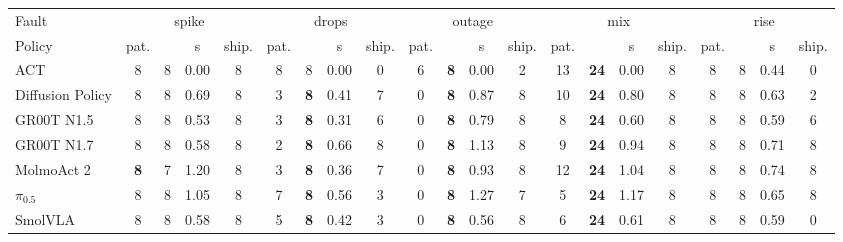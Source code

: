 \begin{tabular}{l cccccccccccccccccccc}
\toprule
Fault & \multicolumn{4}{c}{spike} & \multicolumn{4}{c}{drops} & \multicolumn{4}{c}{outage} & \multicolumn{4}{c}{mix} & \multicolumn{4}{c}{rise} \\
\cmidrule(lr){2-5}\cmidrule(lr){6-9}\cmidrule(lr){10-13}\cmidrule(lr){14-17}\cmidrule(lr){18-21}
Policy & pat. & \drtc{} & s & ship. & pat. & \drtc{} & s & ship. & pat. & \drtc{} & s & ship. & pat. & \drtc{} & s & ship. & pat. & \drtc{} & s & ship. \\
\midrule
ACT & 8 & 8 & 0.00 & 8 & 8 & 8 & 0.00 & 0 & 6 & \textbf{8} & 0.00 & 2 & 13 & \textbf{24} & 0.00 & 8 & 8 & 8 & 0.44 & 0 \\
Diffusion Policy & 8 & 8 & 0.69 & 8 & 3 & \textbf{8} & 0.41 & 7 & 0 & \textbf{8} & 0.87 & 8 & 10 & \textbf{24} & 0.80 & 8 & 8 & 8 & 0.63 & 2 \\
GR00T N1.5 & 8 & 8 & 0.53 & 8 & 3 & \textbf{8} & 0.31 & 6 & 0 & \textbf{8} & 0.79 & 8 & 8 & \textbf{24} & 0.60 & 8 & 8 & 8 & 0.59 & 6 \\
GR00T N1.7 & 8 & 8 & 0.58 & 8 & 2 & \textbf{8} & 0.66 & 8 & 0 & \textbf{8} & 1.13 & 8 & 9 & \textbf{24} & 0.94 & 8 & 8 & 8 & 0.71 & 8 \\
MolmoAct 2 & \textbf{8} & 7 & 1.20 & 8 & 3 & \textbf{8} & 0.36 & 7 & 0 & \textbf{8} & 0.93 & 8 & 12 & \textbf{24} & 1.04 & 8 & 8 & 8 & 0.74 & 8 \\
$\pi_{0.5}$ & 8 & 8 & 1.05 & 8 & 7 & \textbf{8} & 0.56 & 3 & 0 & \textbf{8} & 1.27 & 7 & 5 & \textbf{24} & 1.17 & 8 & 8 & 8 & 0.65 & 8 \\
SmolVLA & 8 & 8 & 0.58 & 8 & 5 & \textbf{8} & 0.42 & 3 & 0 & \textbf{8} & 0.56 & 8 & 6 & \textbf{24} & 0.61 & 8 & 8 & 8 & 0.59 & 0 \\
\bottomrule
\end{tabular}

